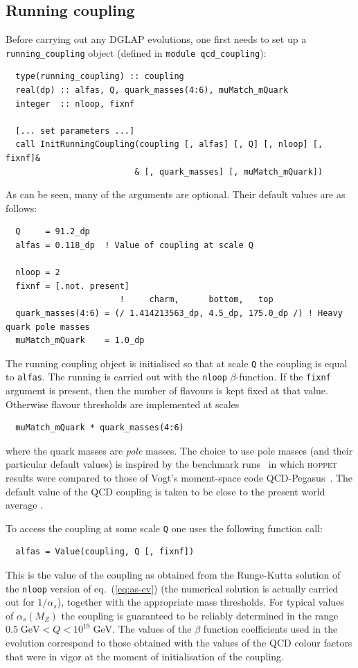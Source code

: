 \documentclass[12pt]{article}
\newcommand{\GeV}{\;\mathrm{GeV}}
\newcommand{\as}{\alpha_s}
\newcommand{\hoppet}{\textsc{hoppet}\xspace}
\newcommand{\ttt}[1]{\texttt{#1}}
\begin{document}
\subsection{Running coupling}
\label{sec:run-coupl}

Before carrying out any DGLAP evolutions, one first needs to set up 
a \ttt{running\_coupling} object (defined in \ttt{module
  qcd\_coupling}):
\begin{lstlisting}
  type(running_coupling) :: coupling
  real(dp) :: alfas, Q, quark_masses(4:6), muMatch_mQuark
  integer  :: nloop, fixnf

  [... set parameters ...]
  call InitRunningCoupling(coupling [, alfas] [, Q] [, nloop] [, fixnf]&
                          & [, quark_masses] [, muMatch_mQuark])
\end{lstlisting}
As can be seen, many of the arguments are optional. Their default
values are as follows:
\begin{lstlisting}
  Q     = 91.2_dp
  alfas = 0.118_dp  ! Value of coupling at scale Q
 
  nloop = 2
  fixnf = [.not. present]
                       !     charm,      bottom,   top
  quark_masses(4:6) = (/ 1.414213563_dp, 4.5_dp, 175.0_dp /) ! Heavy quark pole masses
  muMatch_mQuark    = 1.0_dp
\end{lstlisting}
The running coupling object is initialised so that at scale \ttt{Q}
the coupling is equal to \ttt{alfas}. The running is carried out with
the \ttt{nloop} $\beta$-function. If the \ttt{fixnf} argument is
present, then the number of flavours is kept fixed at that
value. Otherwise flavour thresholds are implemented at scales
\begin{lstlisting}
  muMatch_mQuark * quark_masses(4:6)
\end{lstlisting}
where the quark masses are \emph{pole} masses. The choice to use pole
masses (and their particular default values) is inspired by the
benchmark runs~\cite{Benchmarks} in which \hoppet results were
compared to those of Vogt's moment-space code
QCD-Pegasus~\cite{Pegasus}. The default value of the
QCD coupling is taken to be close
to the present world average \cite{Bethke:2006ac}.

To access the coupling at some scale \ttt{Q} one uses the following
function call:
\begin{lstlisting}
  alfas = Value(coupling, Q [, fixnf])
\end{lstlisting}
This is the value of the coupling as obtained from the Runge-Kutta
solution of the \ttt{nloop} version of eq.~(\ref{eq:as-ev}) (the
numerical solution is actually carried out for $1/\as$), together with the
appropriate mass thresholds. For
typical values of $\as(M_Z)$ the coupling is guaranteed to be reliably
determined in the range $0.5 \GeV < Q < 10^{19}\GeV$. The values of
the $\beta$ function coefficients used in the evolution correspond to
those obtained with the values of the QCD colour factors that were in
vigor at the moment of initialisation of the coupling.
\end{document}
